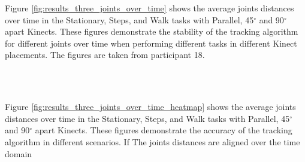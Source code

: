 
\FloatBarrier

Figure \ref{fig:results_three_joints_over_time} shows the average joints distances over time in the Stationary, Steps, and Walk tasks with Parallel, 45$^{\circ}$ and 90$^{\circ}$ apart Kinects. These figures demonstrate the stability of the tracking algorithm for different joints over time when performing different tasks in different Kinect placements. The figures are taken from participant 18.

\begin{figure*}[!htb]
  \centering

  \subfloat[Stationary]{
     
    
    
  } \\
  \subfloat[Steps]{
     
    
    
  } \\
  \subfloat[Walk]{
     
    
    
  }

  \caption{Average coordinates distances over time in the Stationary, Steps, and Walk tasks with Parallel, 45$^{\circ}$, and 90 $^{\circ}$ apart Kinects.}

  \label{fig:results_three_joints_over_time}
\end{figure*}
\FloatBarrier

Figure \ref{fig:results_three_joints_over_time_heatmap} shows the average joints distances over time in the Stationary, Steps, and Walk tasks with Parallel, 45$^{\circ}$ and 90$^{\circ}$ apart Kinects. These figures demonstrate the accuracy of the tracking algorithm in different scenarios. If The joints distances are aligned over the time domain

